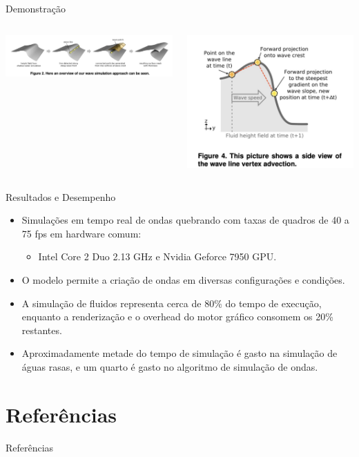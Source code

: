 \documentclass[aspectratio=169,xcolor=table]{beamer}
\begin{document}
\begin{frame}{Demonstração}
    \begin{columns}
        \centering
        \includegraphics[width=\textwidth]{imgs/real-time-1.png}
        
        \centering
        \includegraphics[width=\textwidth]{imgs/real-time-2.png}
    \end{columns}
\end{frame}

\begin{frame}{Resultados e Desempenho}
    \begin{itemize}
        \item Simulações em tempo real de ondas quebrando com taxas de quadros de 40 a 75 fps em hardware comum:
              \begin{itemize}
                  \item Intel Core 2 Duo 2.13 GHz e Nvidia Geforce 7950 GPU.
              \end{itemize}
        \item O modelo permite a criação de ondas em diversas configurações e condições.
        \item A simulação de fluidos representa cerca de 80\% do tempo de execução, enquanto a renderização e o overhead do motor gráfico consomem os 20\% restantes.
        \item Aproximadamente metade do tempo de simulação é gasto na simulação de águas rasas, e um quarto é gasto no algoritmo de simulação de ondas.
    \end{itemize}
\end{frame}

\section{Referências}
\begin{frame}[allowframebreaks]{Referências}
    \nocite{*}
    
    
\end{frame}
\end{document}
